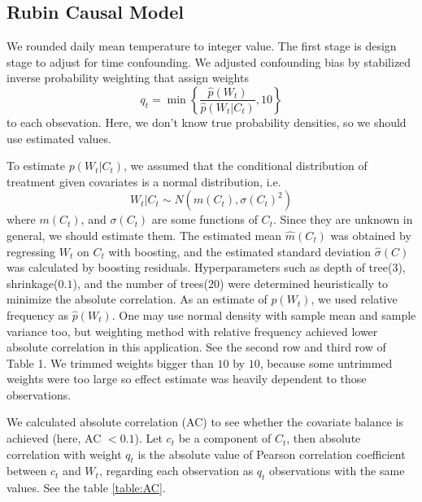 \documentclass[12pt]{article}
\begin{document}
\subsection{Rubin Causal Model}

We rounded daily mean temperature to integer value.
The first stage is design stage to adjust for time confounding.
We adjusted confounding bias by stabilized inverse probability weighting\cite{sipw2010}
that assign weights
\[
	q_t = \min{ \left \{ \frac{\hat{p}(W_t)}{\hat{p}(W_t \lvert C_t)}, 10 \right \} }
\]
to each obsevation.
Here, we don't know true probability densities,
so we should use estimated values.

To estimate $p(W_t \lvert C_t)$, 
we assumed that 
the conditional distribution of treatment given covariates is a normal distribution, i.e.
\[ 
	W_t\lvert C_t \sim N(m(C_t), \sigma(C_t)^2) 
\] 
where $m(C_t)$, and $\sigma(C_t)$ are some functions of $C_t$.
Since they are unknown in general, we should estimate them. 
The estimated mean $\hat{m}(C_t)$ was obtained by regressing $W_t$ on $C_t$ with boosting, 
and the estimated standard deviation $\hat{\sigma}(C)$ was calculated
by boosting residuals\cite{hirano2004, gpsboosting2015}.
Hyperparameters such as depth of tree($3$), shrinkage($0.1$), and the number of trees($20$) 
were determined heuristically to minimize the absolute correlation.
As an estimate of $p(W_t)$, we used relative frequency as $\hat{p}(W_t)$.
One may use normal density with sample mean and sample variance too, but
weighting method with relative frequency achieved lower absolute correlation in this application.
See the second row and third row of Table 1.
We trimmed weights bigger than $10$ by $10$,
because some untrimmed weights were too large so
effect estimate was heavily dependent to those observations.

We calculated absolute correlation (AC)\cite{gpsboosting2015} 
to see whether the covariate balance is achieved (here, AC $<0.1$).
Let $c_t$ be a component of $C_t$, then absolute correlation with weight $q_t$ is
the absolute value of Pearson correlation coefficient between $c_t$ and $W_t$,
regarding each observation as $q_t$ observations with the same values.
See the table \ref{table:AC}.
\end{document}
